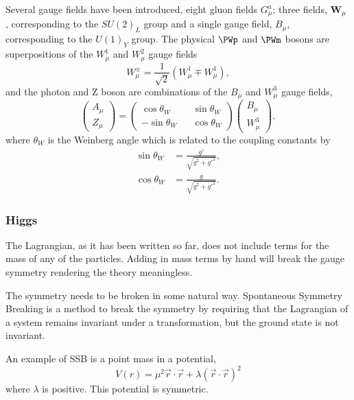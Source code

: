 Several gauge fields have been introduced, eight gluon fields $G^{a}_{\mu}$;
three fields, $\mathbf{W}_{\mu}$ , corresponding to the $SU(2)_{L}$
group and a single gauge field, $B_{\mu}$, corresponding to the $U(1)_{Y}$ group.
The physical $\PWp$ and $\PWm$ bosons are superpositions of the $W^{1}_{\mu}$
and $W^{2}_{\mu}$ gauge fields
\begin{equation}
W^{\pm}_{\mu} = \frac{1}{\sqrt{2}} \left(W^{1}_{\mu} \mp W^{1}_{\mu}\right),
\label{eq:wgauge}
\end{equation}
and the photon and Z boson are combinations of the $B_{\mu}$ and $W^{3}_{\mu}$
gauge fields,
\begin{equation}
\left( \begin{matrix} A_{\mu}\\ Z_{\mu}\end{matrix}\right) =
\left( \begin{matrix} \cos\theta_{W} && \sin\theta_{W} \\  
                      -\sin\theta_{W} && \cos\theta_{W} \end{matrix}\right) 
\left( \begin{matrix} B_{\mu}\\ W^{3}_{\mu}\end{matrix}\right) ,
\label{eq:bgauge}
\end{equation}
where $\theta_{W}$ is the Weinberg angle which is related to the coupling
constants by
\begin{align*}
\sin\theta_{W} &= \frac{g\prime}{\sqrt{g^{2}+g\prime^{2}}},\\
\cos\theta_{W} &= \frac{g}{\sqrt{g^{2}+g\prime^{2}}}.
\end{align*}

\subsubsection{Higgs}

The Lagrangian, as it has been written so far, does not include terms for the
mass of any of the particles.  Adding in mass terms by hand will break the gauge
symmetry rendering the theory meaningless.  

The symmetry needs to be broken in some natural way.  Spontaneous Symmetry
Breaking is a method to break the symmetry by requiring that the Lagrangian of a
system remains invariant under a transformation, but the ground state is not
invariant.

An example of \ac{SSB} is a point mass in a potential,
\begin{equation}
V(r) = \mu^{2} \vec{r} \cdot \vec{r} + \lambda ( \vec{r} \cdot \vec{r} )^{2}
\end{equation}
where $\lambda$ is positive. This potential is symmetric. 

